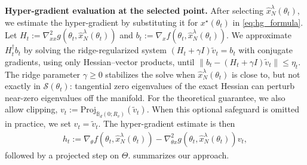\documentclass{article}
\DeclareRobustCommand{\stagecirc}[1]{%
  \tikz[baseline=(char.base)]{%
    \node[draw,circle,inner sep=0pt,minimum size=1.5ex] (char) {\scriptsize #1};%
  }%
}
\theoremstyle{normaltheorem}
\newcommand{\calS}{\mathcal{S}}
\begin{document}
\textbf{\stagecirc{B} Hyper-gradient evaluation at the selected point.}
After selecting $\hat{x}_N^\lambda(\theta_t)$, we estimate the hyper-gradient by substituting it for $x^\star(\theta_t)$ in \cref{eq:hg_formula}. Let $H_t:=\nabla^2_{xx}g(\theta_t,\hat{x}_N^\lambda(\theta_t))$ and $b_t:=\nabla_x f(\theta_t,\hat{x}_N^\lambda(\theta_t))$.
We approximate $H_t^\dagger b_t$ by solving the ridge-regularized system $(H_t+\gamma I)\tilde v_t=b_t$ with conjugate gradients, using only Hessian--vector products, until $\|b_t-(H_t+\gamma I)\tilde v_t\|\le \eta_t$.
The ridge parameter $\gamma\ge 0$ stabilizes the solve when $\hat{x}_N^\lambda(\theta_t)$ is close to, but not exactly in $\calS(\theta_t)$: tangential zero eigenvalues of the exact Hessian can perturb  near-zero eigenvalues off the manifold. 
For the theoretical guarantee, we also allow clipping, \(v_t:=\mathrm{Proj}_{\mathbb B_d(0;R_v)}(\tilde v_t)\).
When this optional safeguard is omitted in practice, we set \(v_t=\tilde v_t\). The hyper-gradient estimate is then
\begin{align}\label{eq:003}
    \widehat h_t
    :=
    \nabla_\theta f(\theta_t,\hat{x}_N^\lambda(\theta_t))
    -
    \nabla^2_{\theta x}g(\theta_t,\hat{x}_N^\lambda(\theta_t))v_t,
\end{align}
followed by a projected step on $\Theta$.  summarizes our approach.
\end{document}
